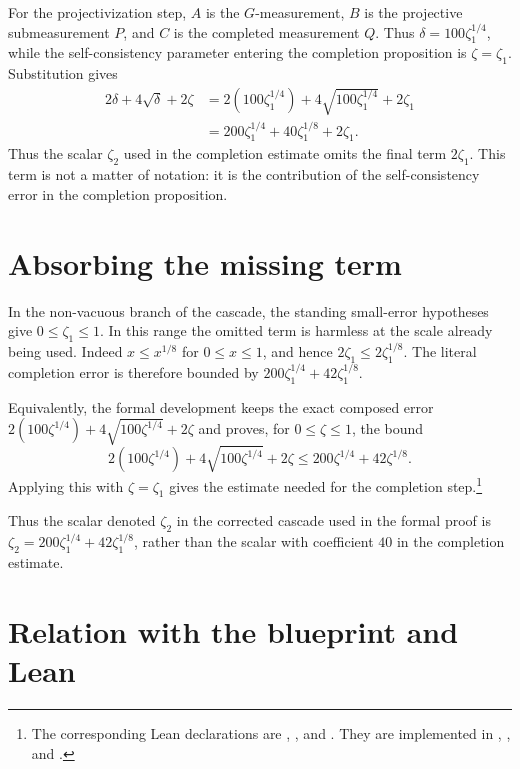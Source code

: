 \documentclass[11pt]{article}
\newcommand{\dd}{\delta}
\newcommand{\zz}{\zeta}
\begin{document}
For the projectivization step, \(A\) is the \(G\)-measurement, \(B\) is the
projective submeasurement \(P\), and \(C\) is the completed measurement \(Q\).
Thus \(\dd=100\zeta_1^{1/4}\), while the self-consistency parameter entering
the completion proposition is \(\zz=\zeta_1\).  Substitution gives
\begin{align*}
  2\dd+4\sqrt{\dd}+2\zz
    &=
  2(100\zeta_1^{1/4})
    +4\sqrt{100\zeta_1^{1/4}}
    +2\zeta_1\\
    &=
  200\zeta_1^{1/4}
    +40\zeta_1^{1/8}
    +2\zeta_1 .
\end{align*}
Thus the scalar \(\zeta_2\) used in the completion estimate omits the final term
\(2\zeta_1\).  This term is not a matter of notation: it is the contribution of
the self-consistency error in the completion proposition.

\section{Absorbing the missing term}

In the non-vacuous branch of the cascade, the standing small-error hypotheses
give \(0\leq\zeta_1\leq 1\).  In this range the omitted term is harmless at the
scale already being used.  Indeed \(x\leq x^{1/8}\) for \(0\leq x\leq 1\), and
hence \(2\zeta_1\leq 2\zeta_1^{1/8}\).  The literal completion error is
therefore bounded by \(200\zeta_1^{1/4}+42\zeta_1^{1/8}\).

Equivalently, the formal development keeps the exact composed error
\(2(100\zeta^{1/4})+4\sqrt{100\zeta^{1/4}}+2\zeta\) and proves, for
\(0\leq \zeta\leq 1\), the bound
\[
  2(100\zeta^{1/4})+4\sqrt{100\zeta^{1/4}}+2\zeta
  \leq 200\zeta^{1/4}+42\zeta^{1/8}.
\]
Applying this with \(\zeta=\zeta_1\) gives the estimate needed for the
completion step.\footnote{The corresponding Lean declarations are
,
, and
.  They are implemented in
,
, and
.}

Thus the scalar denoted \(\zeta_2\) in the corrected cascade used in the formal
proof is
\(\zeta_2=200\zeta_1^{1/4}+42\zeta_1^{1/8}\), rather than the scalar with
coefficient \(40\) in the completion estimate.

\section{Relation with the blueprint and Lean}
\end{document}

